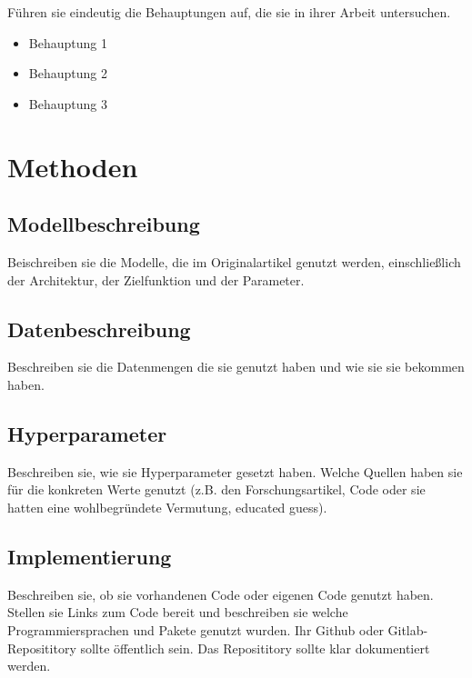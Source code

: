 \documentclass[DIV=13,fontsize=11pt]{scrartcl}
\begin{document}
Führen sie eindeutig die Behauptungen auf, die sie in ihrer Arbeit untersuchen. 
\begin{itemize}
    \item Behauptung 1
    \item Behauptung 2
    \item Behauptung 3
\end{itemize}

\section{Methoden}


\subsection{Modellbeschreibung}
Beischreiben sie die Modelle, die im Originalartikel genutzt werden, einschließlich der Architektur, der Zielfunktion und der Parameter. 

\subsection{Datenbeschreibung}
Beschreiben sie die Datenmengen die sie genutzt haben und wie sie sie bekommen haben. 

\subsection{Hyperparameter}
Beschreiben sie, wie sie Hyperparameter gesetzt haben. Welche Quellen haben sie für die konkreten Werte genutzt (z.B. den Forschungsartikel, Code oder sie hatten eine wohlbegründete Vermutung, educated guess).

\subsection{Implementierung}
Beschreiben sie, ob sie vorhandenen Code oder eigenen Code genutzt haben.
Stellen sie Links zum Code bereit und beschreiben sie welche Programmiersprachen und Pakete genutzt wurden.
Ihr Github oder Gitlab-Reposititory sollte öffentlich sein. 
Das Reposititory sollte klar dokumentiert werden. 
\end{document}
